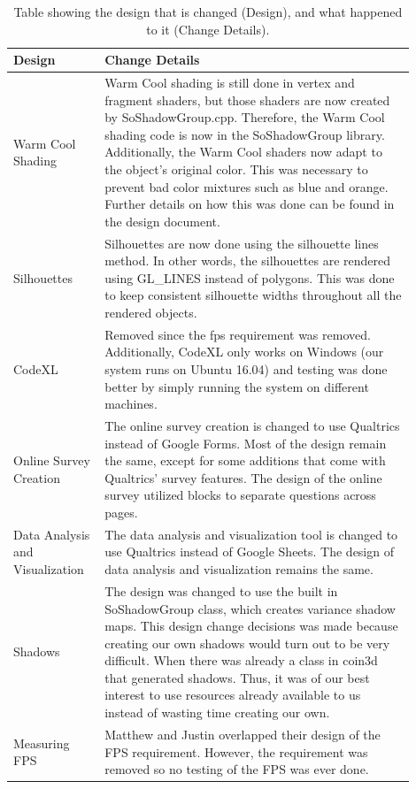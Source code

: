 \documentclass[10pt,journal,compsoc,draftclsnofoot]{IEEEtran}
\begin{document}
\begin{flushleft}
\begin{center}
\begin{table}[H]
\caption{Table showing the design that is changed (Design), and what happened to it (Change Details).}
\begin{tabular}{ | p{0.2\linewidth} | p{0.7\linewidth} | }
\hline
\textbf{Design}  & \textbf{Change Details} \\ \hline
Warm Cool Shading & 
Warm Cool shading is still done in vertex and fragment shaders, but those shaders are now created by SoShadowGroup.cpp. 
Therefore, the Warm Cool shading code is now in the SoShadowGroup library. 
Additionally, the Warm Cool shaders now adapt to the object's original color. 
This was necessary to prevent bad color mixtures such as blue and orange. 
Further details on how this was done can be found in the design document. \\ \hline
Silhouettes & Silhouettes are now done using the silhouette lines method. 
In other words, the silhouettes are rendered using GL\_LINES instead of polygons. 
This was done to keep consistent silhouette widths throughout all the rendered objects. \\ \hline
CodeXL & Removed since the fps requirement was removed. 
Additionally, CodeXL only works on Windows (our system runs on Ubuntu 16.04) and testing was done better by simply running the system on different machines. \\ \hline
Online Survey Creation & 
The online survey creation is changed to use Qualtrics instead of Google Forms.
Most of the design remain the same, except for some additions that come with Qualtrics' survey features.
The design of the online survey utilized blocks to separate questions across pages. \\ \hline
Data Analysis and Visualization & 
The data analysis and visualization tool is changed to use Qualtrics instead of Google Sheets.
The design of data analysis and visualization remains the same. \\ \hline
Shadows &
The design was changed to use the built in SoShadowGroup class, which creates variance shadow maps.
This design change decisions was made because creating our own shadows would turn out to be very difficult.
When there was already a class in coin3d that generated shadows.
Thus, it was of our best interest to use resources already available to us instead of wasting time creating our own. \\ \hline
Measuring FPS &
Matthew and Justin overlapped their design of the FPS requirement.
However, the requirement was removed so no testing of the FPS was ever done.

\end{tabular}
\end{table}
\end{center}
\end{flushleft}
\end{document}
